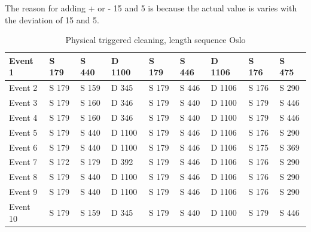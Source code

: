 The reason for adding + or - 15 and 5 is because the actual value is varies with the deviation of 15 and 5.

\begin{table}[H]
\centering
\caption{Physical triggered cleaning, length sequence Oslo}
\label{tab:PCSequenceOslo}
\begin{tabular}{|l|l|l|l|l|l|l|l|l|}
\hline
Event 1  & S 179 & S 440 & D 1100 & S 179 & S 446 & D 1106 & S 176 & S 475 \\ \hline
Event 2  & S 179 & S 159 & D 345  & S 179 & S 446 & D 1106 & S 176 & S 290 \\ \hline
Event 3  & S 179 & S 160 & D 346  & S 179 & S 440 & D 1100 & S 179 & S 446 \\ \hline
Event 4  & S 179 & S 160 & D 346  & S 179 & S 440 & D 1100 & S 179 & S 446 \\ \hline
Event 5  & S 179 & S 440 & D 1100 & S 179 & S 446 & D 1106 & S 176 & S 290 \\ \hline
Event 6  & S 179 & S 440 & D 1100 & S 179 & S 446 & D 1106 & S 175 & S 369 \\ \hline
Event 7  & S 172 & S 179 & D 392  & S 179 & S 446 & D 1106 & S 176 & S 290 \\ \hline
Event 8  & S 179 & S 440 & D 1100 & S 179 & S 446 & D 1106 & S 176 & S 290 \\ \hline
Event 9  & S 179 & S 440 & D 1100 & S 179 & S 446 & D 1106 & S 176 & S 290 \\ \hline
Event 10 & S 179 & S 159 & D 345  & S 179 & S 440 & D 1100 & S 179 & S 446 \\ \hline
\end{tabular}
\end{table}

